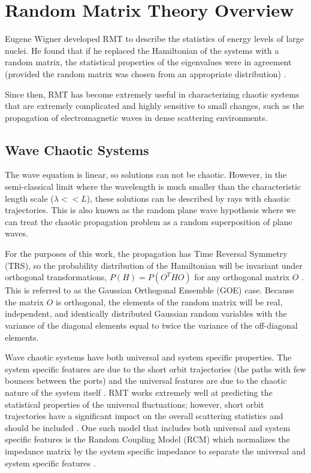 \renewcommand{\baselinestretch}{2} \small\normalsize
\chapter{Random Matrix Theory Overview}
Eugene Wigner developed RMT to describe the statistics of energy levels of large nuclei. He found that if he replaced the Hamiltonian of the systems with a random matrix, the statistical properties of the eigenvalues were in agreement (provided the random matrix was chosen from an appropriate distribution) \cite{ott_chaos}.

Since then, RMT has become extremely useful in characterizing chaotic systems that are extremely complicated and highly sensitive to small changes, such as the propagation of electromagnetic waves in dense scattering environments.

\section{Wave Chaotic Systems}
The wave equation is linear, so solutions can not be chaotic. However, in the semi-classical limit where the wavelength is much smaller than the characteristic length scale ($\lambda << L$), these solutions can be described by rays with chaotic trajectories. This is also known as the random plane wave hypothesis where we can treat the chaotic propagation problem as a random superposition of plane waves.

For the purposes of this work, the propagation has Time Reversal Symmetry (TRS), so the probability distribution of the Hamiltonian will be invariant under orthogonal transformations, $P(H) = P(O^THO)$ for any orthogonal matrix $O$ \cite{ott_chaos}. This is referred to as the Gaussian Orthogonal Ensemble (GOE) case. Because the matrix $O$ is orthogonal, the elements of the random matrix will be real, independent, and identically distributed Gaussian random variables with the variance of the diagonal elements equal to twice the variance of the off-diagonal elements.

Wave chaotic systems have both universal and system specific properties. The system specific features are due to the short orbit trajectories (the paths with few bounces between the ports) and the universal features are due to the chaotic nature of the system itself \cite{bohigas}. RMT works extremely well at predicting the statistical properties of the universal fluctuations; however, short orbit trajectories have a significant impact on the overall scattering statistics and should be included \cite{hart_so} \cite{yeh_universal}. One such model that includes both universal and system specific features is the Random Coupling Model (RCM) which normalizes the impedance matrix by the system specific impedance to separate the universal and system specific features  \cite{zheng_single} \cite{zheng_multiple} \cite{hemmady_review} \cite{gradoni_review}.

